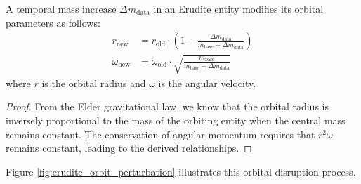 \begin{theorem}
A temporal mass increase $\Delta m_{\text{data}}$ in an Erudite entity modifies its orbital parameters as follows:
\begin{align}
r_{\text{new}} &= r_{\text{old}} \cdot \left(1 - \frac{\Delta m_{\text{data}}}{m_{\text{base}} + \Delta m_{\text{data}}}\right) \\
\omega_{\text{new}} &= \omega_{\text{old}} \cdot \sqrt{\frac{m_{\text{base}}}{m_{\text{base}} + \Delta m_{\text{data}}}}
\end{align}
where $r$ is the orbital radius and $\omega$ is the angular velocity.
\end{theorem}

\begin{proof}
From the Elder gravitational law, we know that the orbital radius is inversely proportional to the mass of the orbiting entity when the central mass remains constant. The conservation of angular momentum requires that $r^2\omega$ remains constant, leading to the derived relationships.
\end{proof}

Figure \ref{fig:erudite_orbit_perturbation} illustrates this orbital disruption process.

